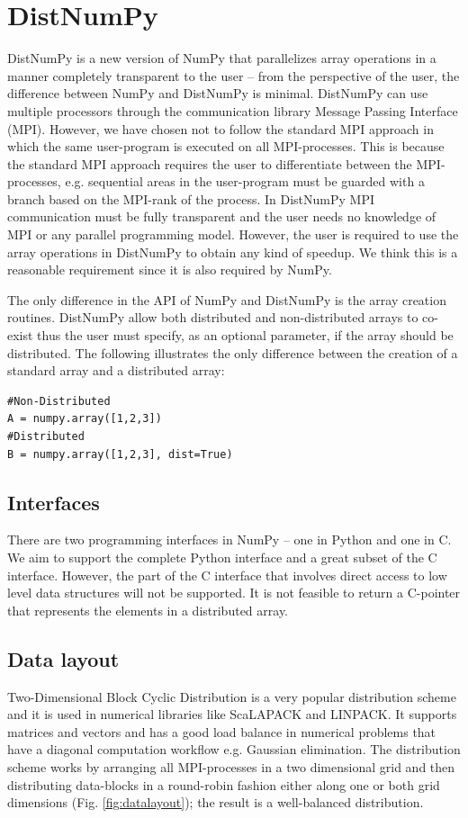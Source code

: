 \documentclass{sigplanconf}
\begin{document}
\section{DistNumPy}
DistNumPy is a new version of NumPy that parallelizes array operations in a manner completely transparent to the user -- from the perspective of the user, the difference between NumPy and DistNumPy is minimal. DistNumPy can use multiple processors through the communication library Message Passing Interface (MPI)\cite{mpi}. However, we have chosen not to follow the standard MPI approach in which the same user-program is executed on all MPI-processes. This is because the standard MPI approach requires the user to differentiate between the MPI-processes, e.g. sequential areas in the user-program must be guarded with a branch based on the MPI-rank of the process. In DistNumPy MPI communication must be fully transparent and the user needs no knowledge of MPI or any parallel programming model. However, the user is required to use the array operations in DistNumPy to obtain any kind of speedup. We think this is a reasonable requirement since it is also required by NumPy.

The only difference in the API of NumPy and DistNumPy is the array creation routines. DistNumPy allow both distributed and non-distributed arrays to co-exist thus the user must specify, as an optional parameter, if the array should be distributed. The following illustrates the only difference between the creation of a standard array and a distributed array:
\lstset{frame=none, xleftmargin=0mm, numbers=none}
\begin{lstlisting}
#Non-Distributed
A = numpy.array([1,2,3])
#Distributed
B = numpy.array([1,2,3], dist=True)
\end{lstlisting}
\lstset{frame=single, xleftmargin=5mm, numbers=left}


\subsection{Interfaces}
There are two programming interfaces in NumPy -- one in Python and one in C. We aim to support the complete Python interface and a great subset of the C interface. However, the part of the C interface that involves direct access to low level data structures will not be supported. It is not feasible to return a C-pointer that represents the elements in a distributed array.


\subsection{Data layout}
Two-Dimensional Block Cyclic Distribution is a very popular distribution scheme and it is used in numerical libraries like ScaLAPACK\cite{Blackford96} and LINPACK\cite{linpack79}. It supports matrices and vectors and has a good load balance in numerical problems that have a diagonal computation workflow e.g. Gaussian elimination. The distribution scheme works by arranging all MPI-processes in a two dimensional grid and then distributing data-blocks in a round-robin fashion either along one or both grid dimensions (Fig. \ref {fig:datalayout}); the result is a well-balanced distribution.
\end{document}
